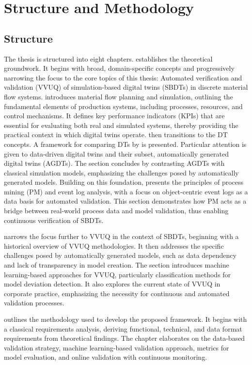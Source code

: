 \section{Structure and Methodology}

\subsection*{Structure}
The thesis is structured into eight chapters.
 establishes the theoretical groundwork. It begins with broad, domain-specific concepts and progressively narrowing the focus to the core topics of this thesis: Automated verification and validation (VVUQ) of simulation-based digital twins (SBDTs) in discrete material flow systems.
 introduces material flow planning and simulation, outlining the fundamental elements of production systems, including processes, resources, and control mechanisms. It defines key performance indicators (KPIs) that are essential for evaluating both real and simulated systems, thereby providing the practical context in which digital twins operate.
 then transitions to the DT concepts. A framework for comparing DTs by \textcite{schwede2024learning} is presented. Particular attention is given to data-driven digital twins and their subset, automatically generated digital twins (AGDTs). The section concludes by contrasting AGDTs with classical simulation models, emphasizing the challenges posed by automatically generated models.
Building on this foundation,  presents the principles of process mining (PM) and event log analysis, with a focus on object-centric event logs as a data basis for automated validation. This section demonstrates how PM acts as a bridge between real-world process data and model validation, thus enabling continuous verification of SBDTs.

 narrows the focus further to VVUQ in the context of SBDTs, beginning with a historical overview of VVUQ methodologies. It then addresses the specific challenges posed by automatically generated models, such as data dependency and lack of transparency in model creation. The section introduces machine learning-based approaches for VVUQ, particularly classification methods for model deviation detection. It also explores the current state of VVUQ in corporate practice, emphasizing the necessity for continuous and automated validation processes.

 outlines the methodology used to develop the proposed framework. It begins with a classical requirements analysis, deriving functional, technical, and data format requirements from theoretical findings. The chapter elaborates on the data-based validation strategy, machine learning-based validation approach, metrics for model evaluation, and online validation with continuous monitoring.

